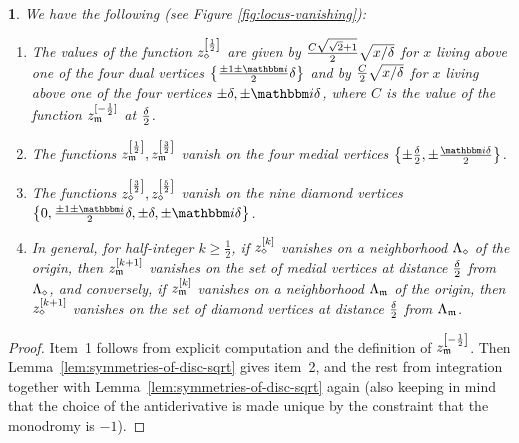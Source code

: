\documentclass[12pt,oneside,english]{amsart}
\numberwithin{equation}{section}
\numberwithin{figure}{section}
\theoremstyle{plain}
\theoremstyle{plain}
\theoremstyle{plain}
\theoremstyle{plain}
\newtheorem{lem}[thm]{\protect\lemmaname}
\theoremstyle{remark}
\theoremstyle{definition}
\theoremstyle{plain}
\theoremstyle{plain}
\numberwithin{thm}{section}
\newcommand{\kallemod}[1]{{\color{kallecol} {#1}}}
\providecommand{\lemmaname}{Lemma}
\providecommand{\lemmaname}{Lemma}
\providecommand{\lemmaname}{Lemma}
\providecommand{\lemmaname}{Lemma}
\begin{document}
\begin{lem}
\label{lem:pos-half-int-mon-vals}We have the following (see Figure
\ref{fig:locus-vanishing}): 
\begin{enumerate}
\item The values of the function $z_{\diamond}^{\left[\frac{1}{2}\right]}$
are given by
$\frac{C \sqrt{\sqrt{2}+1}}{2 }\sqrt{x/{\delta}}$
for $x$ living
above one of the four dual vertices
$\set{ \frac{\pm 1 \pm \ii}{2} \meshsz }$
and by $\frac{C}{2} \sqrt{x/{\delta}}$ 
for $x$ living above one of the four vertices
$\pm \meshsz, \pm \ii \meshsz $, where $C$ is the value of the function
$z_{\mathfrak{m}}^{[-\frac{1}{2}]}$ at $\frac{{\delta}}{2}$. 
\item The functions 
$z_{\mathfrak{m}}^{\left[\frac{1}{2}\right]},
z_{\mathfrak{m}}^{\left[\frac{3}{2}\right]}$
vanish on the four medial vertices
$\set{ \pm \frac{\meshsz}{2} , \pm \frac{\ii \meshsz }{2} } $. 
\item The functions 
$z_{\diamond}^{\left[\frac{3}{2}\right]} , z_{\diamond}^{\left[\frac{5}{2}\right]}$
vanish on the nine diamond vertices
$\set{ 0, \frac{\pm 1 \pm \ii}{2} \meshsz , \pm \meshsz , \pm \ii \meshsz } $. 
\item In general, for half-integer $k\geq\frac{1}{2}$, if 
$z_{\diamond}^{\left[k\right]}$
vanishes on a neighborhood $\Lambda_{\diamond}$ of the origin, then
$z_{\mathfrak{m}}^{\left[k+1\right]}$
vanishes on the set of medial vertices at distance $\frac{{\delta}}{2}$
from $\Lambda_{\diamond}$, and conversely, if $z_{\mathfrak{m}}^{\left[k\right]}$
vanishes on a neighborhood $\Lambda_{\mathfrak{m}}$ of the origin, then
$z_{\diamond}^{\left[k+1\right]}$
vanishes on the set of diamond vertices at distance $\frac{{\delta}}{2}$
from $\Lambda_{\mathfrak{m}}$. 
\end{enumerate}
\end{lem}
\begin{proof}
Item~1 follows from explicit computation and the definition of 
$z_{\mathfrak{m}}^{\left[-\frac{1}{2}\right]}$.
Then Lemma~\ref{lem:symmetries-of-disc-sqrt}
gives item~2, and the rest
from integration together with Lemma~\ref{lem:symmetries-of-disc-sqrt} again 
(also keeping in mind that the choice of the antiderivative
is made unique by the constraint that the monodromy is $-1$).
\end{proof}
\end{document}
